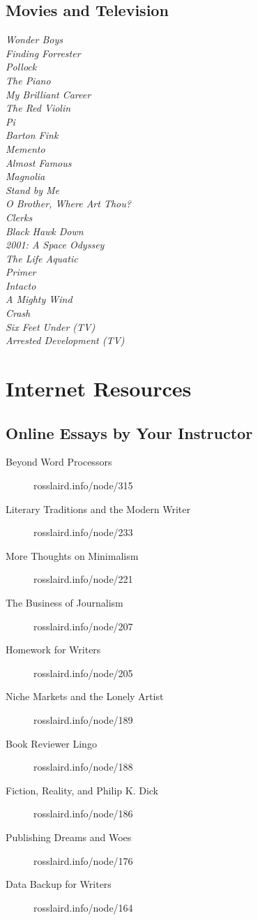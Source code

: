 \documentclass[letterpaper,oneside]{memoir}
\begin{document}
\subsection{Movies and Television}
\textit{Wonder Boys\\
Finding Forrester\\
Pollock\\
The Piano\\
My Brilliant Career\\
The Red Violin\\
Pi\\
Barton Fink\\
Memento\\
Almost Famous\\
Magnolia\\
Stand by Me\\
O Brother, Where Art Thou?\\
Clerks\\
Black Hawk Down\\
2001: A Space Odyssey\\
The Life Aquatic\\
Primer\\
Intacto\\
A Mighty Wind\\
Crash\\
Six Feet Under (TV)\\
Arrested Development (TV)}\\
\newpage
\section{Internet Resources}
\subsection{Online Essays by Your Instructor}
  \begin{description}
  \item [Beyond Word Processors] rosslaird.info/node/315
  \item [Literary Traditions and the Modern Writer]  rosslaird.info/node/233
\item [More Thoughts on Minimalism] rosslaird.info/node/221
\item [The Business of Journalism] rosslaird.info/node/207 
\item [Homework for Writers] rosslaird.info/node/205
\item [Niche Markets and the Lonely Artist] rosslaird.info/node/189
\item [Book Reviewer Lingo] rosslaird.info/node/188
\item [Fiction, Reality, and Philip K. Dick] rosslaird.info/node/186
\item [Publishing Dreams and Woes] rosslaird.info/node/176
\item [Data Backup for Writers] rosslaird.info/node/164
  \end{description}
\end{document}
